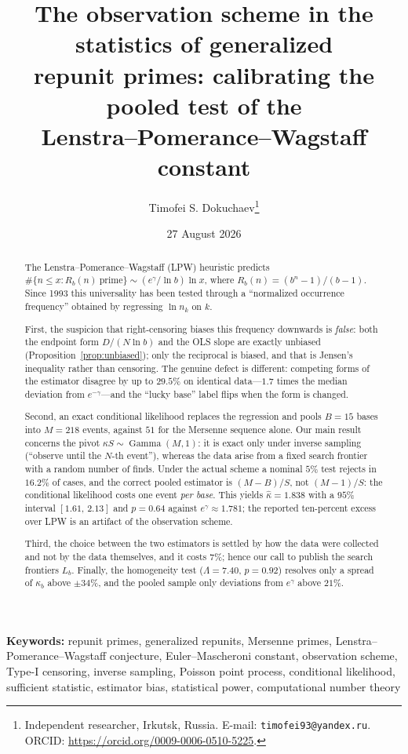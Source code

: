 \documentclass[11pt,a4paper]{article}
\title{The observation scheme in the statistics of generalized\\
repunit primes: calibrating the pooled test of the\\
Lenstra--Pomerance--Wagstaff constant}
\author{Timofei S. Dokuchaev\thanks{Independent researcher, Irkutsk, Russia.
E-mail: \texttt{timofei93@yandex.ru}. ORCID:
\url{https://orcid.org/0009-0006-0510-5225}.}}
\date{27 August 2026}
\theoremstyle{plain}
\theoremstyle{remark}
\newcommand{\Rb}{R_b}
\newcommand{\eg}{e^{\gamma}}
\newcommand{\emg}{e^{-\gamma}}
\DeclareMathOperator{\Gam}{Gamma}
\begin{document}
\maketitle

\begin{abstract}
\noindent The Lenstra--Pomerance--Wagstaff (LPW) heuristic predicts
$\#\{n\le x:\Rb(n)\ \text{prime}\}\sim(\eg/\ln b)\ln x$, where
$\Rb(n)=(b^{n}-1)/(b-1)$. Since 1993 this universality has been tested through a
``normalized occurrence frequency'' obtained by regressing $\ln n_k$ on $k$.

First, the suspicion that right-censoring biases this frequency downwards is
\emph{false}: both the endpoint form $D/(N\ln b)$ and the OLS slope are exactly
unbiased (Proposition~\ref{prop:unbiased}); only the reciprocal is biased, and
that is Jensen's inequality rather than censoring. The genuine defect is
different: competing forms of the estimator disagree by up to $29.5\%$ on
identical data---$1.7$ times the median deviation from $\emg$---and the ``lucky
base'' label flips when the form is changed.

Second, an exact conditional likelihood replaces the regression and pools
$B=15$ bases into $M=218$ events, against $51$ for the Mersenne sequence alone.
Our main result concerns the pivot $\kappa S\sim\Gam(M,1)$: it is exact only
under inverse sampling (``observe until the $N$-th event''), whereas the data
arise from a fixed search frontier with a random number of finds. Under the
actual scheme a nominal $5\%$ test rejects in $16.2\%$ of cases, and the correct
pooled estimator is $(M-B)/S$, not $(M-1)/S$: the conditional likelihood costs
one event \emph{per base}. This yields $\hat\kappa=1.838$ with a $95\%$ interval
$[1.61,\,2.13]$ and $p=0.64$ against $\eg\approx1.781$; the reported
ten-percent excess over LPW is an artifact of the observation scheme.

Third, the choice between the two estimators is settled by how the data were
collected and not by the data themselves, and it costs $7\%$; hence our call to
publish the search frontiers $L_b$. Finally, the homogeneity test
($\Lambda=7.40$, $p=0.92$) resolves only a spread of $\kappa_b$ above
$\pm34\%$, and the pooled sample only deviations from $\eg$ above $21\%$.
\end{abstract}

\medskip
\noindent\textbf{Keywords:} repunit primes, generalized repunits, Mersenne
primes, Lenstra--Pomerance--Wagstaff conjecture, Euler--Mascheroni constant,
observation scheme, Type-I censoring, inverse sampling, Poisson point process,
conditional likelihood, sufficient statistic, estimator bias, statistical power,
computational number theory
\end{document}
